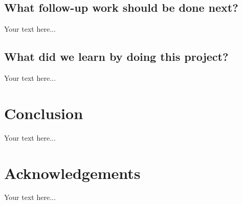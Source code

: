 \documentclass[accepted,single]{gipaper}
\begin{document}
\subsection{What follow-up work should be done next?}

Your text here...

\subsection{What did we learn by doing this project? }

Your text here...


\section{Conclusion}

Your text here...


\section*{Acknowledgements}

Your text here...




\end{document}
